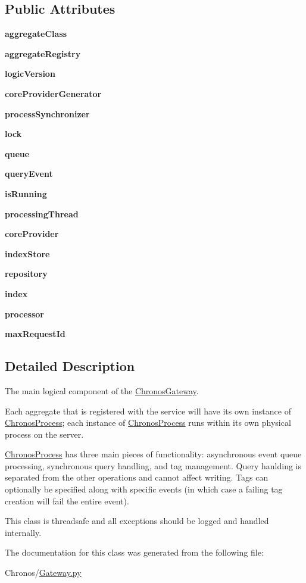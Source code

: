 \subsection*{Public Attributes}
\begin{DoxyCompactItemize}
\item 
{\bfseries aggregate\+Class}
\item 
{\bfseries aggregate\+Registry}
\item 
{\bfseries logic\+Version}
\item 
{\bfseries core\+Provider\+Generator}
\item 
{\bfseries process\+Synchronizer}
\item 
{\bfseries lock}
\item 
{\bfseries queue}
\item 
{\bfseries query\+Event}
\item 
{\bfseries is\+Running}
\item 
{\bfseries processing\+Thread}
\item 
{\bfseries core\+Provider}
\item 
{\bfseries index\+Store}
\item 
{\bfseries repository}
\item 
{\bfseries index}
\item 
{\bfseries processor}
\item 
{\bfseries max\+Request\+Id}
\end{DoxyCompactItemize}


\subsection{Detailed Description}
The main logical component of the \hyperlink{classChronos_1_1Gateway_1_1ChronosGateway}{Chronos\+Gateway}. 

Each aggregate that is registered with the service will have its own instance of \hyperlink{classChronos_1_1Gateway_1_1ChronosProcess}{Chronos\+Process}; each instance of \hyperlink{classChronos_1_1Gateway_1_1ChronosProcess}{Chronos\+Process} runs within its own physical process on the server.

\hyperlink{classChronos_1_1Gateway_1_1ChronosProcess}{Chronos\+Process} has three main pieces of functionality\+: asynchronous event queue processing, synchronous query handling, and tag management. Query hanlding is separated from the other operations and cannot affect writing. Tags can optionally be specified along with specific events (in which case a failing tag creation will fail the entire event).

This class is threadsafe and all exceptions should be logged and handled internally. 

The documentation for this class was generated from the following file\+:\begin{DoxyCompactItemize}
\item 
Chronos/\hyperlink{Gateway_8py}{Gateway.\+py}\end{DoxyCompactItemize}
